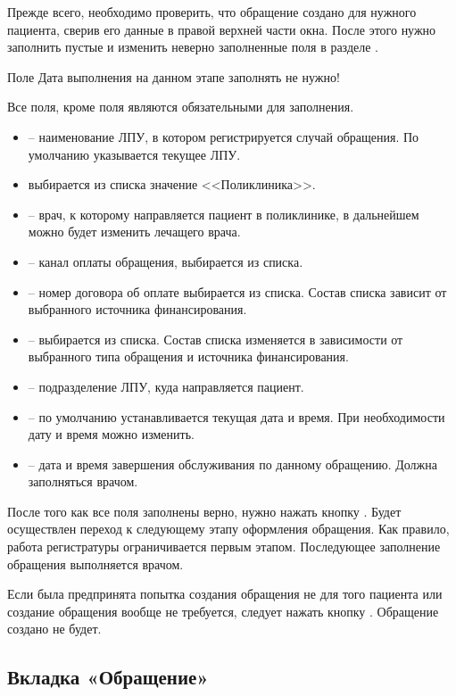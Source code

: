 Прежде всего, необходимо проверить, что обращение создано для нужного пациента, сверив его данные в правой верхней части окна. После этого нужно заполнить пустые и изменить неверно заполненные поля в разделе .

\begin{vnim}
 Поле Дата выполнения на данном этапе заполнять не нужно!
\end{vnim}

Все поля, кроме поля  являются обязательными для заполнения.
\begin{itemize}
 \item {} – наименование ЛПУ, в котором регистрируется случай обращения. По умолчанию указывается текущее ЛПУ.
 \item {} выбирается из списка значение <<Поликлиника>>.
 \item {} – врач, к которому направляется пациент в поликлинике, в дальнейшем можно будет изменить лечащего врача.
 \item {} – канал оплаты обращения, выбирается из списка.
 \item {} – номер договора об оплате выбирается из списка. Состав списка зависит от выбранного источника финансирования.
 \item {} – выбирается из списка. Состав списка изменяется в зависимости от выбранного типа обращения и источника финансирования.
 \item {} – подразделение ЛПУ, куда направляется пациент.
 \item {} – по умолчанию устанавливается текущая дата и время. При необходимости дату и время можно изменить.
 \item {} – дата и время завершения обслуживания по данному обращению. Должна заполняться врачом.
\end{itemize}

После того как все поля заполнены верно, нужно нажать кнопку . Будет осуществлен переход к следующему этапу оформления обращения. Как правило, работа регистратуры ограничивается первым этапом. Последующее заполнение обращения выполняется врачом.

Если была предпринята попытка создания обращения не для того пациента или создание обращения вообще не требуется, следует нажать кнопку . Обращение создано не будет.

\subsection {Вкладка «Обращение»}

